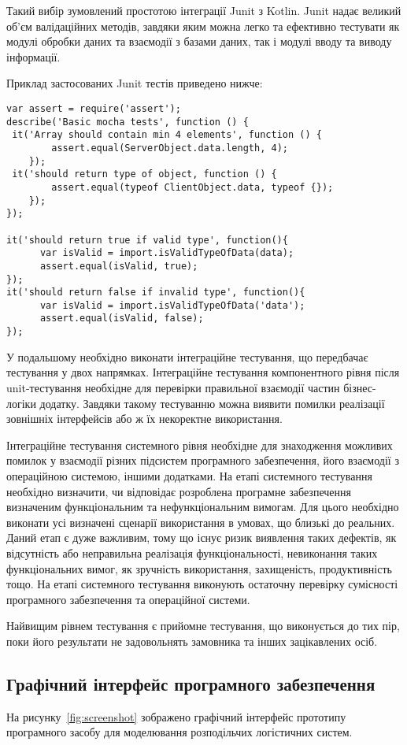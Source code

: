 Такий вибір зумовлений простотою інтеграції Junit з Kotlin. 
Junit надає великий об'єм валідаційних методів, завдяки яким можна легко та ефективно тестувати як модулі обробки даних та взаємодії з базами даних, так і модулі вводу та виводу інформації.

Приклад застосованих Junit тестів приведено нижче:
\begin{lstlisting}
var assert = require('assert');
describe('Basic mocha tests', function () {
 it('Array should contain min 4 elements', function () {
        assert.equal(ServerObject.data.length, 4);
    });
 it('should return type of object, function () {
        assert.equal(typeof ClientObject.data, typeof {});
    });
});

it('should return true if valid type', function(){
      var isValid = import.isValidTypeOfData(data);
      assert.equal(isValid, true);
});
it('should return false if invalid type', function(){
      var isValid = import.isValidTypeOfData('data');
      assert.equal(isValid, false);
});
\end{lstlisting}

У подальшому необхідно виконати інтеграційне тестування, що передбачає тестування у двох напрямках.
Інтеграційне тестування компонентного рівня після unit-тестування необхідне для перевірки правильної взаємодії частин бізнес-логіки додатку. 
Завдяки такому тестуванню можна виявити помилки реалізації зовнішніх інтерфейсів або ж їх некоректне використання.

Інтеграційне тестування системного рівня необхідне для знаходження можливих помилок у взаємодії різних підсистем програмного забезпечення, його взаємодії з операційною системою, іншими додатками.
На етапі системного тестування необхідно визначити, чи відповідає розроблена програмне забезпечення визначеним функціональним та нефункціональним вимогам.
Для цього необхідно виконати усі визначені сценарії використання в умовах, що близькі до реальних. 
Даний етап є дуже важливим, тому що існує ризик виявлення таких дефектів, як відсутність або неправильна реалізація функціональності, невиконання таких функціональних вимог, як зручність використання, захищеність, продуктивність тощо. 
На етапі системного тестування виконують остаточну перевірку сумісності програмного забезпечення та операційної системи.

Найвищим рівнем тестування є прийомне тестування, що виконується до тих пір, поки його результати не задовольнять замовника та інших зацікавлених осіб.

\subsection{Графічний інтерфейс програмного забезпечення}
На рисунку~\ref{fig:screenshot} зображено графічний інтерфейс прототипу програмного засобу для моделювання розподільчих логістичних систем.


